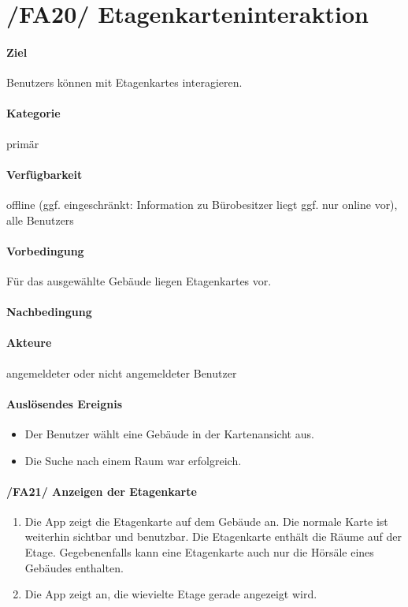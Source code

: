 \section[Etagenkarteninteraktion]{/FA20/ Etagenkarteninteraktion}
\paragraph{Ziel}
\Glspl{Benutzer} können mit \Glspl{Etagenkarte} interagieren.
\paragraph{Kategorie}
primär
\paragraph{Verfügbarkeit}
offline (ggf. eingeschränkt: Information zu Bürobesitzer liegt ggf. nur online vor), alle \Glspl{Benutzer}
\paragraph{Vorbedingung}
Für das ausgewählte Gebäude liegen \Glspl{Etagenkarte} vor.
\paragraph{Nachbedingung}

\paragraph{Akteure}
angemeldeter oder nicht angemeldeter \Gls{Benutzer}
\paragraph{Auslösendes Ereignis}
\begin{itemize}
    \item Der \Gls{Benutzer} wählt eine Gebäude in der \Gls{Kartenansicht} aus.
    \item Die Suche nach einem Raum war erfolgreich.
\end{itemize}
 
\paragraph{/FA21/ Anzeigen der Etagenkarte}
\label{/FA21/}
\begin{enumerate}
    \item Die App zeigt die \Gls{Etagenkarte} auf dem Gebäude an. Die normale \Gls{Karte} ist weiterhin sichtbar und benutzbar. Die \Gls{Etagenkarte} enthält die Räume auf der Etage. Gegebenenfalls kann eine \Gls{Etagenkarte} auch nur die Hörsäle eines Gebäudes enthalten.
    \item Die App zeigt an, die wievielte Etage gerade angezeigt wird.
\end{enumerate}
